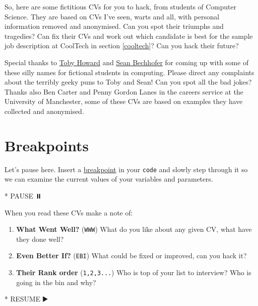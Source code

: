 \documentclass[
]{book}
\newenvironment{Shaded}{\begin{snugshade}}{\end{snugshade}}
\newcommand{\NormalTok}[1]{#1}
\newcommand{\SpecialStringTok}[1]{\textcolor[rgb]{0.31,0.60,0.02}{#1}}
\providecommand{\tightlist}{%
  \setlength{\itemsep}{0pt}\setlength{\parskip}{0pt}}
\begin{document}
So, here are some fictitious CVs for you to hack, from students of Computer Science. They are based on CVs I've seen, warts and all, with personal information removed and anonymised. Can you spot their triumphs and tragedies? Can fix their CVs and work out which candidate is best for the sample job description at CoolTech in section \ref{cooltech}? Can you hack their future?

Special thanks to \href{https://en.wikipedia.org/wiki/Toby_Howard}{Toby Howard} and \href{https://personalpages.manchester.ac.uk/staff/sean.bechhofer/}{Sean Bechhofer} for coming up with some of these silly names for fictional students in computing. Please direct any complaints about the terribly geeky puns to Toby and Sean! Can you spot all the bad jokes? Thanks also Ben Carter and Penny Gordon Lanes in the careers service at the University of Manchester, some of these CVs are based on examples they have collected and anonymised. 🙏

\hypertarget{breakpoints}{%
\section{Breakpoints}\label{breakpoints}}

Let's pause here. Insert a \href{https://en.wikipedia.org/wiki/Breakpoint}{breakpoint} in your \texttt{code} and slowly step through it so we can examine the current values of your variables and parameters.

\begin{Shaded}
\begin{Highlighting}[]
\SpecialStringTok{* }\NormalTok{PAUSE ⏸️}
\end{Highlighting}
\end{Shaded}

When you read these CVs make a note of:

\begin{enumerate}
\def\labelenumi{\arabic{enumi}.}
\tightlist
\item
  \textbf{What Went Well?} (\texttt{WWW}) What do you like about any given CV, what have they done well?
\item
  \textbf{Even Better If?} (\texttt{EBI}) What could be fixed or improved, can you hack it?
\item
  \textbf{Their Rank order} (\texttt{1,2,3...}) Who is top of your list to interview? Who is going in the bin and why?
\end{enumerate}

\begin{Shaded}
\begin{Highlighting}[]
\SpecialStringTok{* }\NormalTok{RESUME ▶️}
\end{Highlighting}
\end{Shaded}
\end{document}
